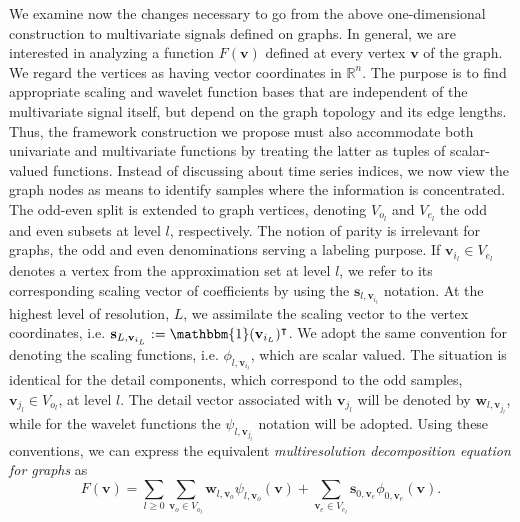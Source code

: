 \documentclass[graybox]{svmult}
\begin{document}
	We examine now the changes necessary to go from the above one-dimensional construction to multivariate signals defined on graphs. In general, we are interested in analyzing a function $F(\mathbf{v})$ defined at every vertex $\mathbf{v}$ of the graph. We regard the vertices as having vector coordinates in $\mathbb{R}^n$. The purpose is to find appropriate scaling and wavelet function bases that are independent of the multivariate signal itself, but depend on the graph topology and its edge lengths. Thus, the framework construction we propose must also accommodate both univariate and multivariate functions by treating the latter as tuples of scalar-valued functions. 
	Instead of discussing about time series indices, we now view the graph nodes as means to identify samples where the information is concentrated.
	The odd-even split is extended to graph vertices, denoting $V_{o_l}$ and $V_{e_l}$
	the odd and even subsets at level $l$, respectively.
	The notion of parity is irrelevant for graphs, the odd and even denominations serving a labeling purpose.
	If $\mathbf{v}_{i_l} \in  {V}_{e_l}$ denotes a vertex from the approximation set at level $l$, we refer to its corresponding scaling vector of coefficients by using the $\mathbf{s}_{l,\mathbf{v}_{i_l}}$ notation. At the highest level of resolution, $L$, we assimilate the scaling vector to the vertex coordinates, i.e. $\mathbf{s}_{L, \mathbf{v}_{i_L}} := \mathbbm{1}(\mathbf{v}_{i_L})^\intercal$. We adopt the same convention for denoting the scaling functions, i.e. $\phi_{l,\mathbf{v}_{i_l}}$, which are scalar valued. The situation is identical for the detail components, which correspond to the odd samples, $\mathbf{v}_{j_l} \in V_{o_l}$, at level $l$. The detail vector associated with $\mathbf{v}_{j_l}$ will be denoted by $\mathbf{w}_{l,\mathbf{v}_{j_l}}$, while for the wavelet functions the $\psi_{l,\mathbf{v}_{j_l}}$ notation will be adopted. Using these conventions, we can express the equivalent \emph{multiresolution decomposition equation for graphs} as
	\begin{equation}
	F(\mathbf{v}) = \sum_{l \geq 0 } \sum_{\mathbf{v}_o \in V_{o_l}} \mathbf{w}_{l,\mathbf{v}_o} \psi_{l, \mathbf{v}_o } (\mathbf{v}) + \sum_{\mathbf{v}_e \in V_{e_l} } \mathbf{s}_{0, \mathbf{v}_e} \phi_{0, \mathbf{v}_e}(\mathbf{v}).
	\label{eq_cds:multiresolution_surface}
	\end{equation}
	
\end{document}
